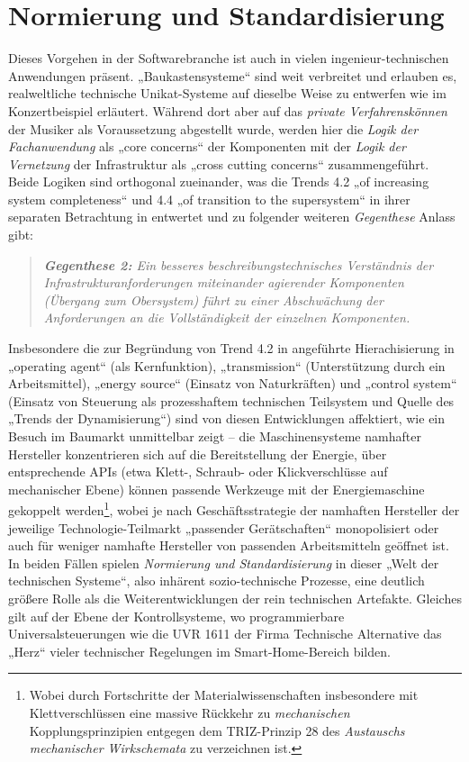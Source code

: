 \documentclass[11pt,a4paper]{article}
\begin{document}
\section{Normierung und Standardisierung}

Dieses Vorgehen in der Softwarebranche ist auch in vielen
ingenieur-technischen Anwendungen präsent. „Baukastensysteme“ sind weit
verbreitet und erlauben es, realweltliche technische Unikat-Systeme auf
dieselbe Weise zu entwerfen wie im Konzertbeispiel erläutert. Während dort
aber auf das \emph{private Verfahrenskönnen} der Musiker als Voraussetzung
abgestellt wurde, werden hier die \emph{Logik der Fachanwendung} als „core
concerns“ der Komponenten mit der \emph{Logik der Vernetzung} der
Infrastruktur als „cross cutting concerns“ zusammengeführt. Beide Logiken sind
orthogonal zueinander, was die Trends 4.2 „of increasing system completeness“
und 4.4 „of transition to the supersystem“ in ihrer separaten Betrachtung in
\cite{TESE2018} entwertet und zu folgender weiteren \emph{Gegenthese} Anlass
gibt:
\begin{quote}\it 
  \textbf{Gegenthese 2:} Ein besseres beschreibungstechnisches Verständnis der
  Infrastrukturanforderungen miteinander agierender Komponenten (Übergang zum
  Obersystem) führt zu einer \emph{Abschwächung} der Anforderungen an die
  Vollständigkeit der einzelnen Komponenten.
\end{quote}
Insbesondere die zur Begründung von Trend 4.2 in \cite{TESE2018} angeführte
Hierachisierung in „operating agent“ (als Kernfunktion), „transmission“
(Unterstützung durch ein Arbeitsmittel), „energy source“ (Einsatz von
Naturkräften) und „control system“ (Einsatz von Steuerung als prozesshaftem
technischen Teilsystem und Quelle des „Trends der Dynamisierung“) sind von
diesen Entwicklungen affektiert, wie ein Besuch im Baumarkt unmittelbar zeigt
-- die Maschinensysteme namhafter Hersteller konzentrieren sich auf die
Bereitstellung der Energie, über entsprechende APIs (etwa Klett-, Schraub-
oder Klickverschlüsse auf mechanischer Ebene) können passende Werkzeuge mit
der Energiemaschine gekoppelt werden\footnote{Wobei durch Fortschritte der
  Materialwissenschaften insbesondere mit Klettverschlüssen eine massive
  Rückkehr zu \emph{mechanischen} Kopplungsprinzipien entgegen dem
  TRIZ-Prinzip 28 des \emph{Austauschs mechanischer Wirkschemata} zu
  verzeichnen ist.}, wobei je nach Geschäftsstrategie der namhaften Hersteller
der jeweilige Technologie-Teilmarkt „passender Gerätschaften“ monopolisiert
oder auch für weniger namhafte Hersteller von passenden Arbeitsmitteln
geöffnet ist. In beiden Fällen spielen \emph{Normierung und Standardisierung}
in dieser „Welt der technischen Systeme“, also inhärent sozio-technische
Prozesse, eine deutlich größere Rolle als die Weiterentwicklungen der rein
technischen Artefakte. Gleiches gilt auf der Ebene der Kontrollsysteme, wo
programmierbare Universalsteuerungen wie die UVR 1611 der Firma Technische
Alternative das „Herz“ vieler technischer Regelungen im Smart-Home-Bereich
bilden.
\end{document}
